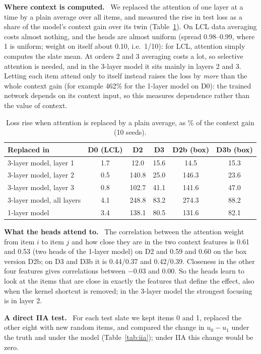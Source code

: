 \documentclass[11pt,a4paper]{article}
\numberwithin{table}{section}
\numberwithin{figure}{section}
\numberwithin{equation}{section}
\newcommand{\para}[1]{\textbf{#1}\ }
\begin{document}
\para{Where context is computed.} We replaced the attention of one layer at a time by a plain average over all items, and measured the rise in test loss as a share of the model's context gain over its twin (Table~\ref{tab:ablate}). On LCL data averaging costs almost nothing, and the heads are almost uniform (spread 0.98--0.99, where 1 is uniform; weight on itself about 0.10, i.e.\ 1/10): for LCL, attention simply computes the slate mean. At orders 2 and 3 averaging costs a lot, so selective attention is needed, and in the 3-layer model it sits mainly in layers 2 and 3. Letting each item attend only to itself instead raises the loss by \emph{more} than the whole context gain (for example 462\% for the 1-layer model on D0): the trained network depends on its context input, so this measures dependence rather than the value of context.

\begin{table}[h]
\centering\small
\caption{Loss rise when attention is replaced by a plain average, as \% of the context gain (10 seeds).}\label{tab:ablate}
\begin{tabular}{@{}lccccc@{}}
\toprule
Replaced in & D0 (LCL) & D2 & D3 & D2b (box) & D3b (box)\\
\midrule
3-layer model, layer 1 & 1.7 & 12.0 & 15.6 & 14.5 & 15.3\\
3-layer model, layer 2 & 0.5 & 140.8 & 25.0 & 146.3 & 23.6\\
3-layer model, layer 3 & 0.8 & 102.7 & 41.1 & 141.6 & 47.0\\
3-layer model, all layers & 4.1 & 248.8 & 83.2 & 274.3 & 88.2\\
1-layer model & 3.4 & 138.1 & 80.5 & 131.6 & 82.1\\
\bottomrule
\end{tabular}
\end{table}

\para{What the heads attend to.} The correlation between the attention weight from item $i$ to item $j$ and how close they are in the two context features is 0.61 and 0.53 (two heads of the 1-layer model) on D2 and 0.59 and 0.60 on the box version D2b; on D3 and D3b it is 0.44/0.37 and 0.42/0.39. Closeness in the other four features gives correlations between $-0.03$ and 0.00. So the heads learn to look at the items that are close in exactly the features that define the effect, also when the kernel shortcut is removed; in the 3-layer model the strongest focusing is in layer 2.

\para{A direct IIA test.} For each test slate we kept items 0 and 1, replaced the other eight with new random items, and compared the change in $u_0-u_1$ under the truth and under the model (Table~\ref{tab:iia}); under IIA this change would be zero.
\end{document}
